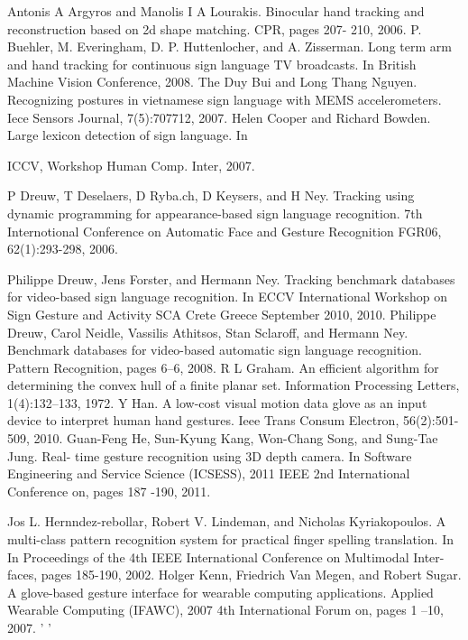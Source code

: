 \documentclass[12pt]{report}           %
\begin{document}
\begin{thebibliography}{80}

 Antonis  A Argyros  and  Manolis I A Lourakis.   Binocular  hand  tracking  and reconstruction  based on 2d shape matching. CPR, pages 207- 210, 2006.
 P.  Buehler,  M. Everingham,  D. P. Huttenlocher,  and A. Zisserman.  Long term arm and hand  tracking  for continuous sign language TV broadcasts.   In British Machine  Vision Conference, 2008.
   The  Duy Bui and Long Thang Nguyen. Recognizing postures in vietnamese sign language with MEMS accelerometers.  Iece Sensors Journal, 7(5):707712, 2007.
  Helen Cooper and Richard Bowden. Large lexicon detection  of sign language.  In

ICCV,  Workshop Human  Comp. Inter, 2007.

   P Dreuw,  T Deselaers, D Ryba.ch, D Keysers,  and H Ney. Tracking using dynamic programming  for appearance-based  sign language recognition.  7th Internotional Conference on Automatic  Face and Gesture Recognition FGR06, 62(1):293-298,
2006.

   Philippe Dreuw, Jens Forster, and Hermann Ney.  Tracking benchmark databases for video-based sign language recognition.  In ECCV  International  Workshop on Sign Gesture and Activity  SCA  Crete Greece September 2010, 2010.
  Philippe  Dreuw,   Carol  Neidle,   Vassilis Athitsos,    Stan  Sclaroff, and  Hermann Ney. Benchmark databases  for video-based automatic  sign language recognition. Pattern  Recognition, pages 6--6, 2008.
  R L Graham.   An efficient algorithm  for determining  the convex hull of a finite planar  set.  Information  Processing Letters, 1(4):132--133, 1972. 
  Y  Han.    A  low-cost  visual   motion   data   glove  as  an  input   device  to  interpret human   hand  gestures.   Ieee Trans Consum Electron, 56(2):501-509, 2010.
  Guan-Feng He, Sun-Kyung Kang, Won-Chang Song, and Sung-Tae Jung.  Real- time gesture recognition using 3D depth  camera.  In Software Engineering and Service Science  (ICSESS),  2011 IEEE  2nd International  Conference on, pages
187 -190, 2011.

  Jos L. Hernndez-rebollar,  Robert V. Lindeman, and Nicholas Kyriakopoulos. A multi-class pattern  recognition system for practical finger spelling translation.  In In Proceedings of the 4th IEEE  International  Conference on Multimodal Inter- faces, pages 185-190, 2002.
  Holger Kenn,  Friedrich Van Megen, and  Robert  Sugar.  A glove-based gesture interface  for wearable  computing  applications.    Applied  Wearable Computing
(IFAWC),  2007 4th International  Forum on, pages 1  --10,   2007.
'                   '


\end{thebibliography}
\end{document}
